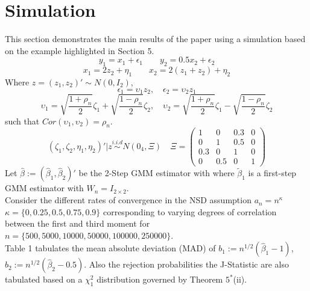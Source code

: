 \documentclass[11pt, fleqn]{article}
\begin{document}
\section{Simulation}
This section demonstrates the main results of the paper using a simulation based on the example highlighted in Section 5.
\begin{equation*} y_{1}=  x_{1} + \epsilon_{1} \qquad y_{2}=0.5 x_2+ \epsilon_{2} \end{equation*}
\begin{equation*} x_1 = 2z_2 +\eta_1 \qquad  x_2 =2(z_1+z_2) +\eta_2 \end{equation*}
Where $z=(z_1,z_2)'\sim N(0,I_2)$,
\begin{equation*}\epsilon_1=\upsilon_1z_2, \quad \epsilon_2=\upsilon_2 z_1\end{equation*}
\begin{equation*} \upsilon_{1}= \sqrt{\frac{1+\rho_n}{2}} \zeta_1 + \sqrt{\frac{1-\rho_n}{2}} \zeta_2, \quad\upsilon_2= \sqrt{\frac{1+\rho_n}{2}} \zeta_1 - \sqrt{\frac{1-\rho_n}{2}} \zeta_2\end{equation*}
such that $Cor(\upsilon_1,\upsilon_2)=\rho_n$.
\begin{equation*} (\zeta_1,\zeta_2,\eta_1, \eta_2)'|z \overset{i.i.d}{\sim} N(0_4, \Xi)\quad \Xi=\left(\begin{array}{cccc}  1 & 0 & 0.3 & 0 \\  0 & 1 & 0.5 & 0 \\ 0.3 & 0 &1 & 0 \\ 0 & 0.5 &0 & 1  \end{array} \right)\end{equation*}
Let $\hat{\beta}:=(\hat{\beta}_1,\hat{\beta}_2)'$ be the 2-Step GMM estimator with  where $\tilde{\beta}_1$ is a first-step GMM estimator with $W_n=I_{2\times2 }$.\\
Consider the different rates of convergence in the NSD assumption $a_n=n^{\kappa}$ $\kappa=\{0,0.25,0.5,0.75,0.9\}$ corresponding to varying degrees of correlation between the first and third moment for \\ $n=\{500,5000,10000,50000,100000,250000\}$.\\
Table 1 tabulates the mean absolute deviation (MAD) of $b_1:=n^{1/2}(\hat{\beta}_1-1)$, $b_2:=n^{1/2}(\hat{\beta}_2-0.5)$.  Also the rejection probabilities the J-Statistic are also tabulated based on a $\chi^2_1$ distribution governed by Theorem $5^*$(ii).
\end{document}
